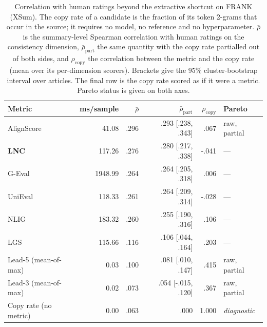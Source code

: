 \begin{table}[t]
\centering
\caption{Correlation with human ratings beyond the extractive shortcut on FRANK (XSum). The copy rate of a candidate is the fraction of its token 2-grams that occur in the source; it requires no model, no reference and no hyperparameter. $\bar{\rho}$ is the summary-level Spearman correlation with human ratings on the consistency dimension, $\bar{\rho}_{\mathrm{part}}$ the same quantity with the copy rate partialled out of both sides, and $\rho_{\mathrm{copy}}$ the correlation between the metric and the copy rate (mean over its per-dimension scorers). Brackets give the 95\% cluster-bootstrap interval over articles. The final row is the copy rate scored as if it were a metric. Pareto status is given on both axes.}
\label{tab:transfer_frank_xsum_confound}
\small
\linespread{1}\selectfont
\setlength{\tabcolsep}{4pt}
\begin{tabular}{@{}lrrrrl@{}}
\toprule
Metric & ms/sample & $\bar{\rho}$ & $\bar{\rho}_{\mathrm{part}}$ & $\rho_{\mathrm{copy}}$ & Pareto \\
\midrule
AlignScore & 41.08 & .296 & .293 {\scriptsize [.238, .343]} & .067 & raw, partial \\
\textbf{LNC} & 117.26 & .276 & .280 {\scriptsize [.217, .338]} & -.041 & --- \\
G-Eval & 1948.99 & .264 & .264 {\scriptsize [.205, .318]} & .006 & --- \\
UniEval & 118.33 & .261 & .264 {\scriptsize [.209, .314]} & -.028 & --- \\
NLIG & 183.32 & .260 & .255 {\scriptsize [.190, .316]} & .106 & --- \\
LGS & 115.66 & .116 & .106 {\scriptsize [.044, .164]} & .203 & --- \\
Lead-5 (mean-of-max) & 0.03 & .100 & .081 {\scriptsize [.010, .147]} & .415 & raw, partial \\
Lead-3 (mean-of-max) & 0.02 & .073 & .054 {\scriptsize [-.015, .120]} & .367 & raw, partial \\
\midrule
Copy rate (no metric) & 0.00 & .063 & .000 & 1.000 & \emph{diagnostic} \\
\bottomrule
\end{tabular}
\end{table}
